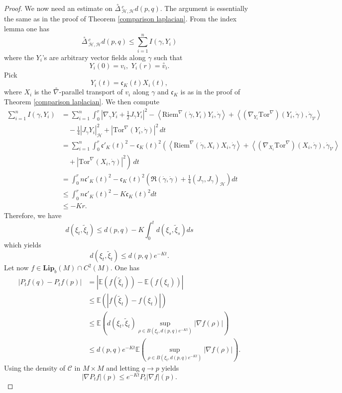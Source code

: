 \documentclass[11pt]{article}
\numberwithin{equation}{section}
\newcommand{\Ho}{\mathcal H}
\newcommand{\V}{\mathcal V}
\newcommand{\Tor}{\mathrm{Tor}}
\begin{document}
\begin{proof}
We now need an estimate on $\overset{\circ}{\Delta}\,^c_{\Ho,\Ho} d (p,q)$. The argument is essentially the same as in the proof of Theorem \ref{comparison laplacian}. From the index lemma one has
\[
\overset{\circ}{\Delta}\,^c_{\Ho,\Ho} d (p,q) \le  \sum_{i=1}^n I(\gamma,Y_i)
\]
where the $Y_i$'s are arbitrary vector fields along $\gamma$ such that
\[
Y_i(0)=v_i, \, \, Y_i(r)=\overset{\circ}{v}_i.
\]
Pick
\[
Y_i(t)=\mathfrak{c}_K (t) X_i(t),
\]
where $X_i$ is the $\overset{\circ}{\nabla}$-parallel transport of $v_i$ along $\gamma$ and $\mathfrak{c}_K$ is as in the proof of Theorem \ref{comparison laplacian}. We then compute
\begin{align*}
 \sum_{i=1}^n I(\gamma,Y_i)  &=  \sum_{i=1}^n  \int_0^r  \left | \nabla_{\dot \gamma}  Y_i +\frac{1}{2} J_{\dot \gamma}  Y_i   \right|^2  -\left \langle \mathrm{Riem}^\nabla(\dot \gamma,Y_i)Y_i, \dot \gamma \right \rangle  +\left\langle (\nabla_{Y_i} \Tor^\nabla)(Y_i,\dot\gamma),\dot \gamma_\V \right\rangle\\
 &\quad -\frac{1}{4} | J_{\dot \gamma} Y_i |^2_\Ho+ |\Tor^\nabla(Y_i,\dot\gamma)|^2 \, dt \\
 &=\sum_{i=1}^n  \int_0^r  \mathfrak{c}'_K(t)^2  - \mathfrak{c}_K(t)^2 \left(  \left \langle \mathrm{Riem}^\nabla(\dot \gamma,X_i)X_i, \dot \gamma \right \rangle  +\left\langle (\nabla_{X_i} \Tor^\nabla)(X_i,\dot\gamma),\dot \gamma_\V \right\rangle \right. \\
 &\left. \quad + |\Tor^\nabla(X_i,\dot\gamma)|^2 \right) \, dt \\
 &=  \int_0^r n  \mathfrak{c}'_K(t)^2-\mathfrak{c}_K(t)^2\left( \mathfrak{R}(\dot \gamma,\dot \gamma) +\frac{1}{4} (J_{\dot \gamma},J_{\dot \gamma})_\Ho \right)dt \\
 &\le  \int_0^r n  \mathfrak{c}'_K(t)^2- K \mathfrak{c}_K(t)^2  dt \\
 &\le -Kr.
\end{align*}
Therefore, we have
\[
d(\xi_t,\tilde{\xi}_t) \le d(p,q)-K \int_0^t d(\xi_s,\tilde{\xi}_s) ds
\]
which yields
\[
d(\xi_t,\tilde{\xi}_t) \le  d(p,q) e^{-Kt}.
\]
Let now $f \in \mathbf{Lip}_b (M)\cap C^2(M)$. One has
\begin{align*}
|P_tf(q)-P_tf(p)|&= \left| \mathbb{E} \left( f(\tilde{\xi}_t) \right)- \mathbb{E}\left(f(\xi_t)\right) \right| \\
 &\le \mathbb{E} \left( \left| f(\tilde{\xi}_t)- f(\xi_t)\right| \right) \\
 &\le   \mathbb{E} \left(d(\xi_t,\tilde{\xi}_t)  \sup_{\rho \in B(\xi_t,d(p,q) e^{-Kt})} \left| \nabla f (\rho)\right| \right) \\
 &\le d(p,q) e^{-Kt}\mathbb{E} \left(  \sup_{\rho \in B(\xi_t,d(p,q) e^{-Kt})} \left| \nabla f (\rho)\right| \right).
\end{align*} 
Using the density of $\mathcal{C}$ in $M\times M$ and letting $q \to p$ yields
\[
|\nabla P_t f|(p)\le e^{-Kt} P_t |\nabla f| (p).
\]
\end{proof}
\end{document}

